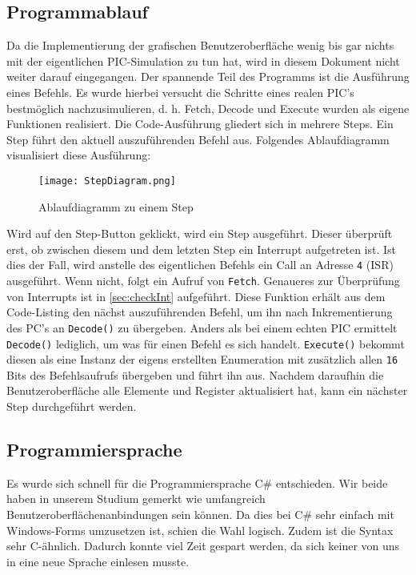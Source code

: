 \documentclass[
10pt, %
a4paper, %
oneside, %
headinclude,footinclude, %
BCOR5mm, %
]{scrartcl}
\begin{document}
	\subsection{Programmablauf}
		Da die Implementierung der grafischen Benutzeroberfläche wenig bis gar nichts mit der eigentlichen PIC-Simulation zu tun hat, wird in diesem Dokument nicht weiter darauf eingegangen. Der spannende Teil des Programms ist die Ausführung eines Befehls. Es wurde hierbei versucht die Schritte eines realen PIC's bestmöglich nachzusimulieren, d. h. Fetch, Decode und Execute wurden als eigene Funktionen realisiert. Die Code-Ausführung gliedert sich in mehrere Steps. Ein Step führt den aktuell auszuführenden Befehl aus. Folgendes Ablaufdiagramm visualisiert diese Ausführung:
		
		\begin{figure}[h]
			\begin{center}
				\texttt{[image: StepDiagram.png]}
				\caption{Ablaufdiagramm zu einem Step}
			\end{center}
		\end{figure}
	
		Wird auf den Step-Button geklickt, wird ein Step ausgeführt. Dieser überprüft erst, ob zwischen diesem und dem letzten Step ein Interrupt aufgetreten ist. Ist dies der Fall, wird anstelle des eigentlichen Befehls ein Call an Adresse \texttt{4} (ISR) ausgeführt. Wenn nicht, folgt ein Aufruf von \texttt{Fetch}. Genaueres zur Überprüfung von Interrupts ist in \ref{sec:checkInt} aufgeführt. Diese Funktion erhält aus dem Code-Listing den nächst auszuführenden Befehl, um ihn nach Inkrementierung des PC's an \texttt{Decode()} zu übergeben. Anders als bei einem echten PIC ermittelt \texttt{Decode()} lediglich, um was für einen Befehl es sich handelt. \texttt{Execute()} bekommt diesen als eine Instanz der eigens erstellten Enumeration mit zusätzlich allen \texttt{16} Bits des Befehlsaufrufs übergeben und führt ihn aus. Nachdem daraufhin die Benutzeroberfläche alle Elemente und Register aktualisiert hat, kann ein nächster Step durchgeführt werden.
		
	\subsection{Programmiersprache}
		Es wurde sich schnell für die Programmiersprache C\# entschieden. Wir beide haben in unserem Studium gemerkt wie umfangreich Benutzeroberflächenanbindungen sein können. Da dies bei C\# sehr einfach mit Windows-Forms umzusetzen ist, schien die Wahl logisch. Zudem ist die Syntax sehr C-ähnlich. Dadurch konnte viel Zeit gespart werden, da sich keiner von uns in eine neue Sprache einlesen musste.
\end{document}
